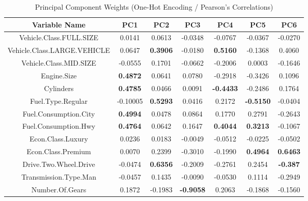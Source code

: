 \documentclass[11pt]{article}
\begin{document}
\begin{table}[ht!]
\centering
\small
\begin{tabular}{c | c c c c c c } 
\hline
Variable Name               &  PC1 &  PC2 &  PC3 &  PC4 &   PC5 &  PC6\\
\hline
Vehicle.Class.FULL.SIZE     & 0.0141 & 0.0613 & -0.0348 & -0.0767 & -0.0367 & -0.0270\\
Vehicle.Class.LARGE.VEHICLE & 0.0647 & \textbf{0.3906} & -0.0180 &  \textbf{0.5160} & -0.1368 &  0.4060\\
Vehicle.Class.MID.SIZE      & -0.0555 & 0.1701 & -0.0662 & -0.2006 &  0.0003 & -0.1646\\
Engine.Size                 & \textbf{0.4872} & 0.0641 &  0.0780 & -0.2918 & -0.3426 &  0.1096\\
Cylinders                   & \textbf{0.4785} & 0.0466 &  0.0091 & \textbf{-0.4433} & -0.2486 &  0.1764\\
Fuel.Type.Regular           & -0.10005 & \textbf{0.5293} &  0.0416 &  0.2172 & \textbf{-0.5150} & -0.0404\\
Fuel.Consumption.City       & \textbf{0.4994} & 0.0478 &  0.0864 &  0.1770 &  0.2791 & -0.2643\\
Fuel.Consumption.Hwy        & \textbf{0.4764} & 0.0642 &  0.1647 &  \textbf{0.4044} &  \textbf{0.3213} & -0.1067\\
Econ.Class.Luxury           & 0.0236 & 0.0183 & -0.0049 & -0.0512 & -0.0225 & -0.0502\\
Econ.Class.Premium          & 0.0070 & 0.2399 & -0.3010 & -0.1990 &  \textbf{0.4964} &  \textbf{0.6463}\\
Drive.Two.Wheel.Drive       & -0.0474 & \textbf{0.6356} & -0.2009 & -0.2761 &  0.2454 & \textbf{-0.387}\\
Transmission.Type.Man       & -0.0457 & 0.1435 & -0.0090 & -0.0530 &  0.1114 & -0.2949\\
Number.Of.Gears             & 0.1872 &-0.1983 & \textbf{-0.9058} &  0.2063 & -0.1868 & -0.1560\\
\hline  
\end{tabular}
\caption{Principal Component Weights (One-Hot Encoding / Pearson's Correlations)}
\end{table}
\end{document}
